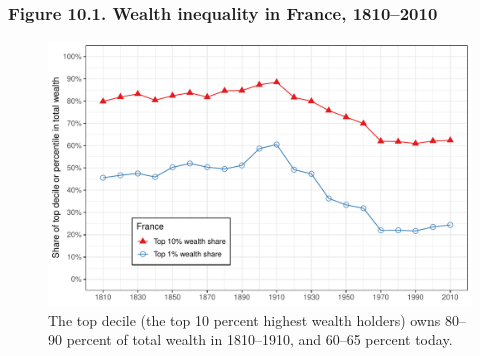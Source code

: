 \documentclass[t]{beamer}\usepackage[]{graphicx}\usepackage[]{color}
\newenvironment{knitrout}{}{} %
\begin{document}
\begin{frame}[label=Figure_10_1]
\frametitle{Figure 10.1. Wealth inequality in France, 1810--2010}
\begin{figure}[t]
\begin{minipage}[b]{\textwidth}
\centering
\begin{knitrout}\footnotesize
{}\color{fgcolor}

{\centering \includegraphics[width=1\linewidth]{figures/color/Figure_10_1} 

}



\end{knitrout}
\caption{The top decile (the top 10 percent highest wealth holders) owns 80--90 percent of total wealth in 1810--1910, and 60--65 percent today.}
\end{minipage}
\end{figure}
\end{frame}
\end{document}
